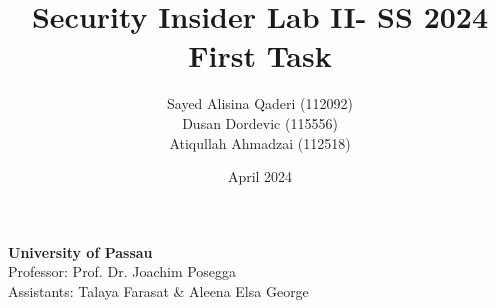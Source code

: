 \documentclass{article}
\title{Security Insider Lab II- SS 2024 \\ First Task}
\author{Sayed Alisina Qaderi (112092) \\ Dusan Dordevic (115556) \\ Atiqullah Ahmadzai (112518)}
\date{April 2024}
\newcommand{\university}{\textbf{University of Passau}}
\newcommand{\professor}{Prof. Dr. Joachim Posegga}
\newcommand{\assistant}{Talaya Farasat \& Aleena Elsa George}
\begin{document}
\maketitle
\thispagestyle{empty} %

\begin{center}
    \university \\
    Professor: \professor \\
    Assistants: \assistant
\end{center}

\clearpage
\tableofcontents
\thispagestyle{empty} %

\clearpage


\clearpage


\clearpage


\thispagestyle{empty} %
\end{document}
